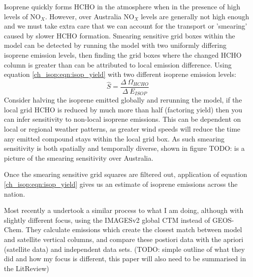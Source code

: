     Isoprene quickly forms HCHO in the atmosphere when in the presence of high levels of NO$_X$.
    However, over Australia NO$_X$ levels are generally not high enough and we must take extra care that we can account for the transport or 'smearing' caused by slower HCHO formation.
    Smearing sensitive grid boxes within the model can be detected by running the model with two uniformly differing isoprene emission levels, then finding the grid boxes where the changed HCHO column is greater than can be attributed to local emission difference.
    Using equation \ref{ch_isop:eqn:isop_yield} with two different isoprene emission levels:
    \begin{equation*}
      \hat{S} = \frac{\Delta~\Omega_{HCHO}}{\Delta~E_{ISOP}}
    \end{equation*}
    Consider halving the isoprene emitted globally and rerunning the model, if the local grid HCHO is reduced by much more than half (factoring yield) then you can infer sensitivity to non-local isoprene emissions.
    This can be dependent on local or regional weather patterns, as greater wind speeds will reduce the time any emitted compound stays within the local grid box.
    As such smearing sensitivity is both spatially and temporally diverse, shown in figure TODO: is a picture of the smearing sensitivity over Australia.
   
    Once the smearing sensitive grid squares are filtered out, application of equation \ref{ch_isop:eqn:isop_yield} gives us an estimate of isoprene emissions across the nation.
    
    Most recently a \citet{Bauwens2016} undertook a similar process to what I am doing, although with slightly different focus, using the IMAGESv2 global CTM instead of GEOS-Chem.
    They calculate emissions which create the closest match between model and satellite vertical columns, and compare these postiori data with the apriori (satellite data) and independent data sets.
    (TODO: simple outline of what they did and how my focus is different, this paper will also need to be summarised in the LitReview)

